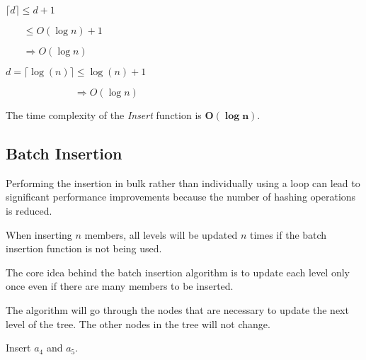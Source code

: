 \documentclass{article}
\begin{document}
\bigbreak

$\lceil d \rceil \leq d + 1$

\bigbreak

$\phantom{\lceil m \rceil} \leq O(\log n) + 1$

\bigbreak

$\phantom{\lceil m \rceil} \Rightarrow \boxed{O(\log n)}$

\bigbreak

$d = \lceil \log (n) \rceil \leq \log (n) + 1$

\bigbreak

$\phantom{d = \lceil \log (n) \rceil} \Rightarrow O(\log n)$

\bigbreak

The time complexity of the \textit{Insert} function is $\boldsymbol{O(\log n)}$.

\subsection{Batch Insertion}

Performing the insertion in bulk rather than individually using a loop can lead to significant performance improvements because the number of hashing operations is reduced.

\bigbreak

When inserting $n$ members, all levels will be updated $n$ times if the batch insertion function is not being used.

The core idea behind the batch insertion algorithm is to update each level only once even if there are many members to be inserted.

The algorithm will go through the nodes that are necessary to update the next level of the tree. The other nodes in the tree will not change.

\bigbreak

Insert $a_4$ and $a_5$.

\bigbreak
\end{document}
